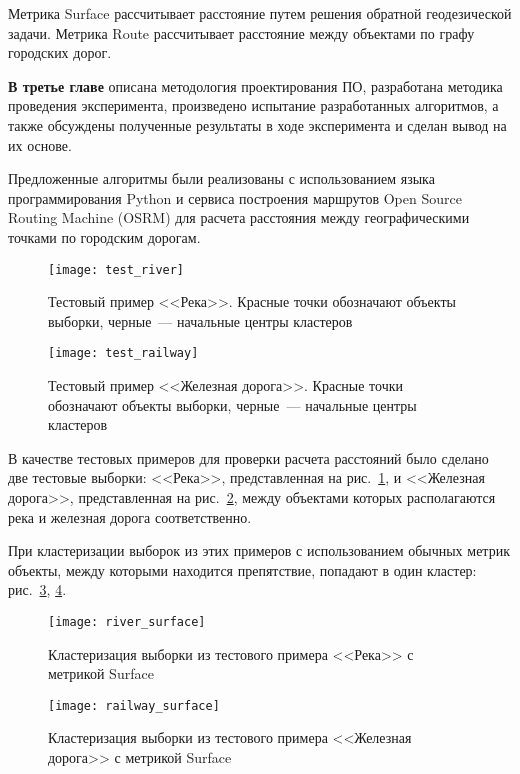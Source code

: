 Метрика Surface рассчитывает расстояние путем решения обратной геодезической задачи. Метрика Route рассчитывает расстояние между объектами по графу городских дорог.

\textbf{В третье главе} описана методология проектирования ПО, разработана методика проведения эксперимента, произведено испытание разработанных алгоритмов, а также обсуждены полученные результаты в ходе эксперимента и сделан вывод на их основе.

Предложенные алгоритмы были реализованы с использованием языка программирования Python и сервиса построения маршрутов Open Source Routing Machine (OSRM) для расчета расстояния между географическими точками по городским дорогам.
\begin{figure}[b!]
    \centering
    \texttt{[image: test\_river]}
    \caption{Тестовый пример <<Река>>. Красные точки обозначают объекты выборки, черные~--- начальные центры кластеров}
    \label{img:river}
    \vspace*{-2em}
\end{figure}

\begin{figure}[t!]
    \centering
    \texttt{[image: test\_railway]}
    \caption{Тестовый пример <<Железная дорога>>. Красные точки обозначают объекты выборки, черные~--- начальные центры кластеров}
    \label{img:railway}
    \vspace*{-1ex}
\end{figure}

В качестве тестовых примеров для проверки расчета расстояний было сделано две тестовые выборки: <<Река>>, представленная на рис.~\ref{img:river}, и <<Железная дорога>>, представленная на рис.~\ref{img:railway}, между объектами которых располагаются река и железная дорога соответственно.

При кластеризации выборок из этих примеров с использованием обычных метрик объекты, между которыми находится препятствие, попадают в один кластер: рис.~\ref{img:river-sur}, \ref{img:railway-sur}.
\begin{figure}[b!]
    \centering
    \texttt{[image: river\_surface]}
    \caption{Кластеризация выборки из тестового примера <<Река>> с метрикой Surface}
    \label{img:river-sur}
    \vspace*{-1em}
\end{figure}

\begin{figure}[t!]
    \centering
    \texttt{[image: railway\_surface]}
    \caption{Кластеризация выборки из тестового примера <<Железная дорога>> с метрикой Surface}
    \label{img:railway-sur}
    \vspace*{-1ex}
\end{figure}

